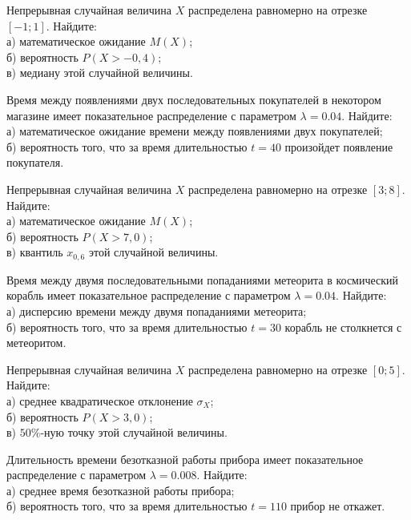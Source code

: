\vfill

\newpage\setcounter{zad}{0}

\z Непрерывная случайная величина $X$ распределена равномерно на отрезке $[-1; 1]$. Найдите: \\ \quad а) математическое ожидание $M(X)$; \\ \quad б) вероятность $P(X>-0{,}4)$; \\ \quad в) медиану этой случайной величины.


\vfill

\z Время между появлениями двух последовательных покупателей в некотором магазине имеет показательное распределение с параметром $\lambda = 0.04$. Найдите: \\ \quad а) математическое ожидание времени между появлениями двух покупателей; \\ \quad б) вероятность того, что за время длительностью $t = 40$  произойдет появление покупателя.
 

\vfill

\newpage\setcounter{zad}{0}

\z Непрерывная случайная величина $X$ распределена равномерно на отрезке $[3; 8]$. Найдите: \\ \quad а) математическое ожидание $M(X)$; \\ \quad б) вероятность $P(X>7{,}0)$; \\ \quad в) квантиль $x_{0{,}6}$ этой случайной величины.


\vfill

\z Время между двумя последовательными попаданиями метеорита в космический корабль имеет показательное распределение с параметром $\lambda = 0.04$. Найдите: \\ \quad а) дисперсию времени между двумя попаданиями метеорита; \\ \quad б) вероятность того, что за время длительностью $t = 30$ корабль не столкнется с метеоритом.
 

\vfill

\newpage\setcounter{zad}{0}

\z Непрерывная случайная величина $X$ распределена равномерно на отрезке $[0; 5]$. Найдите: \\ \quad а) среднее квадратическое отклонение $\sigma_X$; \\ \quad б) вероятность $P(X>3{,}0)$; \\ \quad в) $50\%$-ную точку этой случайной величины.


\vfill

\z Длительность времени безотказной работы прибора имеет показательное распределение с параметром $\lambda = 0.008$. Найдите: \\ \quad а) среднее время безотказной работы прибора; \\ \quad б) вероятность того, что за время длительностью $t = 110$ прибор не откажет.
 

